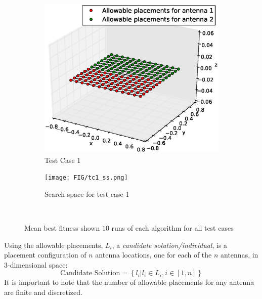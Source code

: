 \documentclass[conference]{IEEEtran}
\begin{document}
\begin{figure}%
    \centering
    \begin{subfigure}{\columnwidth}
        \includegraphics[width=\columnwidth]{FIG/tc_1_figure}%
        \caption{Test Case 1}%
    \label{fig:tc1_figure}%
    \end{subfigure}\hfill%
    \begin{subfigure}{\columnwidth}
        \texttt{[image: FIG/tc1\_ss.png]}%
        \caption{Search space for test case 1}%
        \label{fig:tc1_ss}%
    \end{subfigure}\hfill\\
    \caption{Mean best fitness shown $10$ runs of each algorithm for all test cases}
\end{figure}


%
Using the allowable placements, $L_i$, a \textit{candidate solution/individual}, is a placement configuration of $n$ antenna locations, one for each of the $n$ antennas, in 3-dimensional space:
\[
    \text{Candidate Solution}  = \left\{l_i | l_i \in L_i, i \in [1,n]\right\}
\]
It is important to note that the number of allowable placements for any antenna are finite and discretized. 
\end{document}
